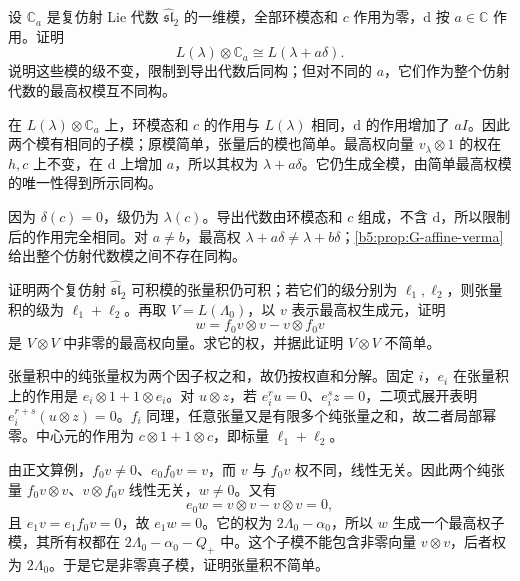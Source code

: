 \begin{exercise}\label{b5:ex:G-degree-shift}
	设 \(\mathbb C_a\) 是复仿射 Lie 代数 \(\widehat{\mathfrak{sl}}_2\) 的一维模，全部环模态和 \(c\) 作用为零，\(\mathrm d\) 按 \(a\in\mathbb C\) 作用。证明
	\[
		L(\lambda)\otimes\mathbb C_a\cong L(\lambda+a\delta).
	\]
	说明这些模的级不变，限制到导出代数后同构；但对不同的 \(a\)，它们作为整个仿射代数的最高权模互不同构。
\end{exercise}
\begin{solution}
	在 \(L(\lambda)\otimes\mathbb C_a\) 上，环模态和 \(c\) 的作用与 \(L(\lambda)\) 相同，\(\mathrm d\) 的作用增加了 \(aI\)。因此两个模有相同的子模；原模简单，张量后的模也简单。最高权向量 \(v_\lambda\otimes1\) 的权在 \(h,c\) 上不变，在 \(\mathrm d\) 上增加 \(a\)，所以其权为 \(\lambda+a\delta\)。它仍生成全模，由简单最高权模的唯一性得到所示同构。

	因为 \(\delta(c)=0\)，级仍为 \(\lambda(c)\)。导出代数由环模态和 \(c\) 组成，不含 \(\mathrm d\)，所以限制后的作用完全相同。对 \(a\ne b\)，最高权 \(\lambda+a\delta\ne\lambda+b\delta\)；\cref{b5:prop:G-affine-verma}给出整个仿射代数模之间不存在同构。
\end{solution}

\begin{exercise}\label{b5:ex:G-integrable-tensor}
	证明两个复仿射 \(\widehat{\mathfrak{sl}}_2\) 可积模的张量积仍可积；若它们的级分别为 \(\ell_1,\ell_2\)，则张量积的级为 \(\ell_1+\ell_2\)。再取 \(V=L(\Lambda_0)\)，以 \(v\) 表示最高权生成元，证明
	\[
		w=f_0v\otimes v-v\otimes f_0v
	\]
	是 \(V\otimes V\) 中非零的最高权向量。求它的权，并据此证明 \(V\otimes V\) 不简单。
\end{exercise}
\begin{solution}
	张量积中的纯张量权为两个因子权之和，故仍按权直和分解。固定 \(i\)，\(e_i\) 在张量积上的作用是 \(e_i\otimes1+1\otimes e_i\)。对 \(u\otimes z\)，若 \(e_i^ru=0\)、\(e_i^sz=0\)，二项式展开表明 \(e_i^{r+s}(u\otimes z)=0\)。\(f_i\) 同理，任意张量又是有限多个纯张量之和，故二者局部幂零。中心元的作用为 \(c\otimes1+1\otimes c\)，即标量 \(\ell_1+\ell_2\)。

	由正文算例，\(f_0v\ne0\)、\(e_0f_0v=v\)，而 \(v\) 与 \(f_0v\) 权不同，线性无关。因此两个纯张量 \(f_0v\otimes v\)、\(v\otimes f_0v\) 线性无关，\(w\ne0\)。又有
	\[
		e_0w=v\otimes v-v\otimes v=0,
	\]
	且 \(e_1v=e_1f_0v=0\)，故 \(e_1w=0\)。它的权为 \(2\Lambda_0-\alpha_0\)，所以 \(w\) 生成一个最高权子模，其所有权都在 \(2\Lambda_0-\alpha_0-Q_+\) 中。这个子模不能包含非零向量 \(v\otimes v\)，后者权为 \(2\Lambda_0\)。于是它是非零真子模，证明张量积不简单。
\end{solution}

